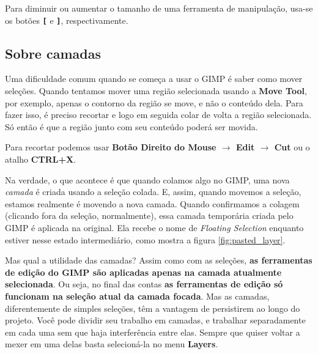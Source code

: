 \documentclass[12pt,onecolumn]{article}
\begin{document}
    \begin{framed}
      Para diminuir ou aumentar o tamanho de uma ferramenta de manipulação,
      usa-se os botões {\bf \verb$[$} e {\bf \verb$]$}, respectivamente.
    \end{framed}
        
  \subsection{Sobre camadas}
    
    Uma dificuldade comum quando se começa a usar o GIMP é saber como mover
    seleções. Quando tentamos mover uma região selecionada usando a {\bf Move
    Tool}, por exemplo, apenas o contorno da região se move, e não o conteúdo
    dela. Para fazer isso, é preciso recortar e logo em seguida colar de volta a
    região selecionada. Só então é que a região junto com seu conteúdo poderá
    ser movida.
    
    \begin{framed}
      Para recortar podemos usar {\bf Botão Direito do Mouse $\rightarrow$ Edit
      $\rightarrow$ Cut} ou o atalho {\bf CTRL+X}.
    \end{framed}
    
    Na verdade, o que acontece é que quando colamos algo no GIMP, uma nova {\it
    camada} é criada usando a seleção colada. E, assim, quando movemos a
    seleção, estamos realmente é movendo a nova camada. Quando confirmamos a
    colagem (clicando fora da seleção, normalmente), essa camada temporária
    criada pelo GIMP é aplicada na original. Ela recebe o nome de {\it Floating
    Selection} enquanto estiver nesse estado intermediário, como mostra a figura
    \ref{fig:pasted_layer}.
    
    Mas qual a utilidade das camadas? Assim como com as seleções, {\bf as
    ferramentas de edição do GIMP são aplicadas apenas na camada atualmente
    selecionada}. Ou seja, no final das contas {\bf as ferramentas de edição só
    funcionam na seleção atual da camada focada}. Mas as camadas, diferentemente
    de simples seleções, têm a vantagem de persistirem ao longo do projeto. Você
    pode dividir seu trabalho em camadas, e trabalhar separadamente em cada uma
    sem que haja interferência entre elas. Sempre que quiser voltar a mexer em
    uma delas basta selecioná-la no menu {\bf Layers}.
    
\end{document}

